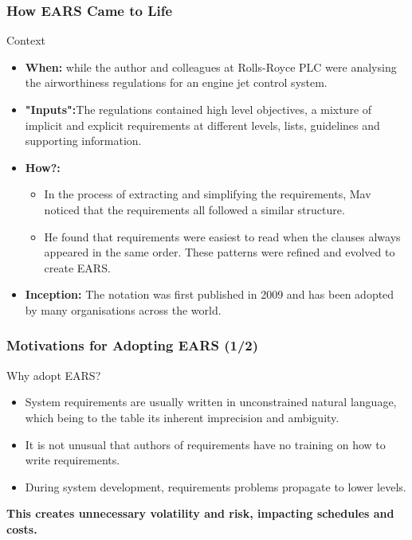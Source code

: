 \documentclass[aspectratio=169]{beamer}
\begin{document}
\begin{frame}
  \frametitle{How EARS Came to Life}
  \begin{block}{Context}
  \begin{itemize}
    \item {\bf When:} while the author and colleagues at Rolls-Royce PLC were analysing the airworthiness regulations for an engine jet control system. 
    \item {\bf "Inputs":}The regulations contained high level objectives, a mixture of implicit and explicit requirements at different levels, lists, guidelines and supporting information.
    \item {\bf How?:} 
      \begin{itemize}
        \item In the process of extracting and simplifying the requirements, Mav noticed that the requirements all followed a similar structure.
      \item He found that requirements were easiest to read when the clauses always appeared in the same order. These patterns were refined and evolved to create EARS.
    \end{itemize}
    \item {\bf Inception:} The notation was first published in 2009 and has been adopted by many organisations across the world.
  \end{itemize}
  \end{block}
\end{frame}
%
\begin{frame}
  \frametitle{Motivations for Adopting EARS (1/2)}
  \begin{block}{Why adopt EARS?}
    \begin{itemize}
      \item System requirements are usually written in unconstrained natural language, which being to the table its inherent imprecision and ambiguity. 
      \item It is not unusual that authors of requirements have no training on how to write requirements. 
      \item During system development, requirements problems propagate to lower levels. 
    \end{itemize}
  \end{block} 
  \begin{alert}
  {\bf This creates unnecessary volatility and risk, impacting schedules and costs.}
  \end{alert}
\end{frame}
\end{document}
